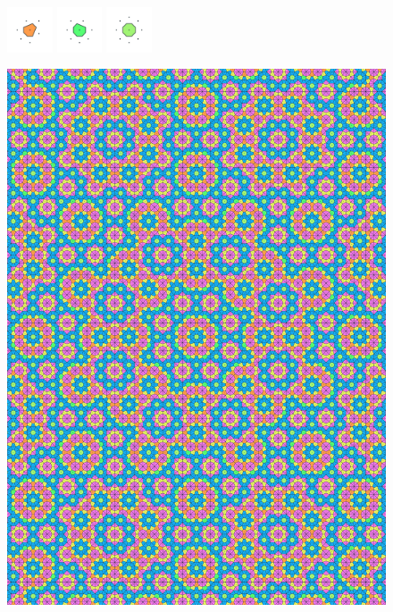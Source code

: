 \documentclass[text.tex]{subfiles}
\begin{document}
\begin{figure}[h!]
\includegraphics[width=0.12\textwidth]{img/results/octagon/octagon_170710_(1_1alpha_2)_005.pdf}
\includegraphics[width=0.12\textwidth]{img/results/octagon/octagon_170710_(1_1alpha_2)_006.pdf}
\includegraphics[width=0.12\textwidth]{img/results/octagon/octagon_170710_(1_1alpha_2)_007.pdf}
\end{figure}

\begin{figure}[h!]
\centering
\includegraphics[width=1\textwidth]{img/results/octagon/quasi_polygon-octagon_170710_(1_1alpha_2).pdf}
\end{figure}
\end{document}
